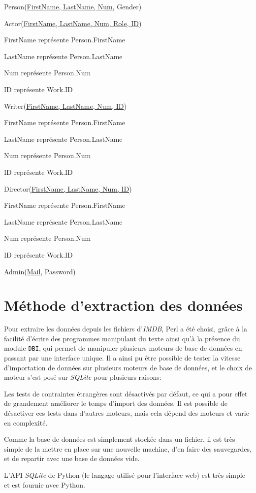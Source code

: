 \documentclass[a4paper,12pt]{article}
\begin{document}
Person(\underline{FirstName, LastName, Num}, Gender)

Actor(\underline{FirstName, LastName, Num, Role, ID})
\begin{list}{-}{}
  \item FirstName représente Person.FirstName
  \item LastName représente Person.LastName
  \item Num représente Person.Num
  \item ID représente Work.ID
\end{list}

Writer(\underline{FirstName, LastName, Num, ID})
\begin{list}{-}{}
  \item FirstName représente Person.FirstName
  \item LastName représente Person.LastName
  \item Num représente Person.Num
  \item ID représente Work.ID
\end{list}

Director(\underline{FirstName, LastName, Num, ID})
\begin{list}{-}{}
  \item FirstName représente Person.FirstName
  \item LastName représente Person.LastName
  \item Num représente Person.Num
  \item ID représente Work.ID
\end{list}

Admin(\underline{Mail}, Password)
\section{Méthode d'extraction des données}
Pour extraire les données depuis les fichiers d'\emph{IMDB}, Perl a
été choisi, grâce à la facilité d'écrire des programmes manipulant du
texte ainsi qu'à la présence du module \texttt{DBI}, qui permet de
manipuler plusieurs moteurs de base de données en passant par une
interface unique. Il a ainsi pu être possible de tester la vitesse
d'importation de données sur plusieurs moteurs de base de données, et
le choix de moteur s'est posé sur \emph{SQLite} pour plusieurs
raisons:

\begin{list}{-}{}
  \item Les tests de contraintes étrangères sont désactivés par
    défaut, ce qui a pour effet de grandement améliorer le temps
    d'import des données. Il est possible de désactiver ces tests dans
    d'autres moteurs, mais cela dépend des moteurs et varie en
    complexité.
  \item Comme la base de données est simplement stockée dans un
    fichier, il est très simple de la mettre en place sur une nouvelle
    machine, d'en faire des sauvegardes, et de repartir avec une base
    de données vide.
  \item L'API \emph{SQLite} de Python (le langage utilisé pour
    l'interface web) est très simple et est fournie avec Python.
\end{list}
\end{document}
